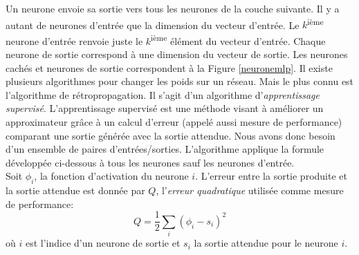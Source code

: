 Un neurone envoie sa sortie vers tous les neurones de la couche suivante.
Il y a autant de neurones d'entrée que la dimension du vecteur d'entrée.
Le $k$\textsuperscript{ième} neurone d'entrée renvoie juste le $k$\textsuperscript{ième} élément du vecteur d'entrée.
Chaque neurone de sortie correspond à une dimension du vecteur de sortie.
Les neurones cachés et neurones de sortie correspondent à la Figure \ref{neuronemlp}.
\label{sec:appmlp}
Il existe plusieurs algorithmes pour changer les poids sur un réseau. Mais le plus connu est l'algorithme de rétropropagation\cite{Haykin,Gauthier}.
Il s'agit d'un algorithme d'\emph{apprentissage supervisé}.
L'apprentissage supervisé est une méthode visant à améliorer un approximateur grâce à un calcul d'erreur (appelé aussi mesure de performance\cite{Gauthier}) comparant une sortie générée avec la sortie attendue.
Nous avons donc besoin d'un ensemble de paires d'entrées/sorties.
L'algorithme applique la formule développée ci-dessous à tous les neurones sauf les neurones d'entrée.\\

Soit $\phi_i$, la fonction d'activation du neurone $i$. L'erreur entre la sortie produite et la sortie attendue est donnée par $Q$, l'\emph{erreur quadratique} utilisée comme mesure de performance:
\begin{equation} \label{eq:Q}
 Q = \frac{1}{2}\sum_{i}(\phi_i-s_i)^2
\end{equation}
où $i$ est l'indice d'un neurone de sortie et $s_i$ la sortie attendue pour le neurone $i$.

